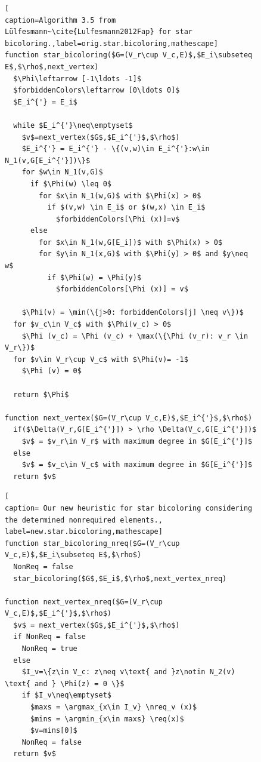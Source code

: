 \documentclass[12pt, twoside,a4paper,toc=bibliography]{scrbook}
\DeclareMathOperator*{\argmin}{arg\,min}
\DeclareMathOperator*{\argmax}{arg\,max}
\newcommand{\nreq}{L}
\newcommand{\req}{M}
\begin{document}
\begin{figure}
\begin{lstlisting}[
caption=Algorithm 3.5 from Lülfesmann~\cite{Lulfesmann2012Fap} for star bicoloring.,label=orig.star.bicoloring,mathescape]
function star_bicoloring($G=(V_r\cup V_c,E)$,$E_i\subseteq E$,$\rho$,next_vertex)
  $\Phi\leftarrow [-1\ldots -1]$
  $forbiddenColors\leftarrow [0\ldots 0]$
  $E_i^{'} = E_i$

  while $E_i^{'}\neq\emptyset$
    $v$=next_vertex($G$,$E_i^{'}$,$\rho$)
    $E_i^{'} = E_i^{'} - \{(v,w)\in E_i^{'}:w\in N_1(v,G[E_i^{'}])\}$
    for $w\in N_1(v,G)$
      if $\Phi(w) \leq 0$
        for $x\in N_1(w,G)$ with $\Phi(x) > 0$
          if $(v,w) \in E_i$ or $(w,x) \in E_i$
            $forbiddenColors[\Phi (x)]=v$
      else
        for $x\in N_1(w,G[E_i])$ with $\Phi(x) > 0$
        for $y\in N_1(x,G)$ with $\Phi(y) > 0$ and $y\neq w$
          if $\Phi(w) = \Phi(y)$
            $forbiddenColors[\Phi (x)] = v$

    $\Phi(v) = \min(\{j>0: forbiddenColors[j] \neq v\})$
  for $v_c\in V_c$ with $\Phi(v_c) > 0$
    $\Phi (v_c) = \Phi (v_c) + \max(\{\Phi (v_r): v_r \in V_r\})$
  for $v\in V_r\cup V_c$ with $\Phi(v)= -1$
    $\Phi (v) = 0$

  return $\Phi$

function next_vertex($G=(V_r\cup V_c,E)$,$E_i^{'}$,$\rho$)
  if($\Delta(V_r,G[E_i^{'}]) > \rho \Delta(V_c,G[E_i^{'}])$
    $v$ = $v_r\in V_r$ with maximum degree in $G[E_i^{'}]$
  else
    $v$ = $v_c\in V_c$ with maximum degree in $G[E_i^{'}]$
  return $v$
\end{lstlisting}

\begin{lstlisting}[
caption= Our new heuristic for star bicoloring considering the determined nonrequired elements.,
label=new.star.bicoloring,mathescape]
function star_bicoloring_nreq($G=(V_r\cup V_c,E)$,$E_i\subseteq E$,$\rho$)
  NonReq = false
  star_bicoloring($G$,$E_i$,$\rho$,next_vertex_nreq)

function next_vertex_nreq($G=(V_r\cup V_c,E)$,$E_i^{'}$,$\rho$)
  $v$ = next_vertex($G$,$E_i^{'}$,$\rho$)
  if NonReq = false
    NonReq = true
  else
    $I_v=\{z\in V_c: z\neq v\text{ and }z\notin N_2(v) \text{ and } \Phi(z) = 0 \}$
    if $I_v\neq\emptyset$
      $maxs = \argmax_{x\in I_v} \nreq_v (x)$
      $mins = \argmin_{x\in maxs} \req(x)$
      $v=mins[0]$
    NonReq = false
  return $v$
\end{lstlisting}
\end{figure}
\end{document}
